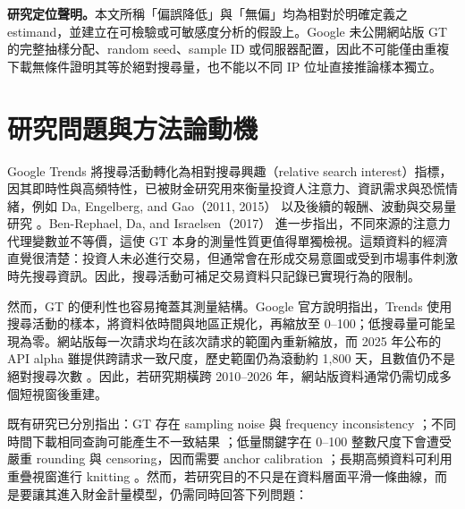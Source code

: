\documentclass[12pt,a4paper,oneside]{article}
\begin{document}
\begin{center}
\begin{minipage}{0.94\textwidth}
\small
\textbf{研究定位聲明。}本文所稱「偏誤降低」與「無偏」均為相對於明確定義之 estimand，並建立在可檢驗或可敏感度分析的假設上。Google 未公開網站版 GT 的完整抽樣分配、random seed、sample ID 或伺服器配置，因此不可能僅由重複下載無條件證明其等於絕對搜尋量，也不能以不同 IP 位址直接推論樣本獨立。
\end{minipage}
\end{center}

\begingroup
{}
\setlength{\parskip}{0pt}
\small
\tableofcontents
\endgroup
\newpage

\section{研究問題與方法論動機}

Google Trends 將搜尋活動轉化為相對搜尋興趣（relative search interest）指標，因其即時性與高頻特性，已被財金研究用來衡量投資人注意力、資訊需求與恐慌情緒，例如 Da, Engelberg, and Gao（2011, 2015）\cite{da2011,da2015} 以及後續的報酬、波動與交易量研究 \cite{choivarian2012,preis2013}。Ben-Rephael, Da, and Israelsen（2017）\cite{benrephael2017} 進一步指出，不同來源的注意力代理變數並不等價，這使 GT 本身的測量性質更值得單獨檢視。這類資料的經濟直覺很清楚：投資人未必進行交易，但通常會在形成交易意圖或受到市場事件刺激時先搜尋資訊。因此，搜尋活動可補足交易資料只記錄已實現行為的限制。

然而，GT 的便利性也容易掩蓋其測量結構。Google 官方說明指出，Trends 使用搜尋活動的樣本，將資料依時間與地區正規化，再縮放至 0--100；低搜尋量可能呈現為零。網站版每一次請求均在該次請求的範圍內重新縮放，而 2025 年公布的 API alpha 雖提供跨請求一致尺度，歷史範圍仍為滾動約 1,800 天，且數值仍不是絕對搜尋次數 \cite{googlefaq,googleapi2025}。因此，若研究期橫跨 2010--2026 年，網站版資料通常仍需切成多個短視窗後重建。

既有研究已分別指出：GT 存在 sampling noise 與 frequency inconsistency \cite{eichenauer2022}；不同時間下載相同查詢可能產生不一致結果 \cite{cebrian2024,medeiros2021}；低量關鍵字在 0--100 整數尺度下會遭受嚴重 rounding 與 censoring，因而需要 anchor calibration \cite{west2020}；長期高頻資料可利用重疊視窗進行 knitting \cite{bleher2022}。然而，若研究目的不只是在資料層面平滑一條曲線，而是要讓其進入財金計量模型，仍需同時回答下列問題：
\end{document}
